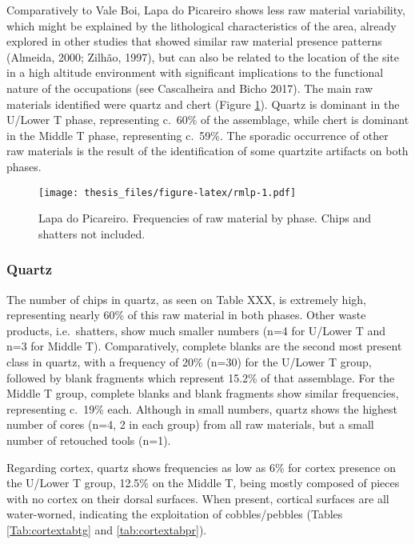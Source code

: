 \documentclass[12pt,twoside]{reedthesis}
\begin{document}
Comparatively to Vale Boi, Lapa do Picareiro shows less raw material variability, which might be explained by the lithological characteristics of the area, already explored in other studies that showed similar raw material presence patterns (Almeida, 2000; Zilhão, 1997), but can also be related to the location of the site in a high altitude environment with significant implications to the functional nature of the occupations (see Cascalheira and Bicho 2017). The main raw materials identified were quartz and chert (Figure \ref{fig:rmlp}). Quartz is dominant in the U/Lower T phase, representing c.~60\% of the assemblage, while chert is dominant in the Middle T phase, representing c.~59\%. The sporadic occurrence of other raw materials is the result of the identification of some quartzite artifacts on both phases.
\begin{figure}
\centering
\texttt{[image: thesis\_files/figure-latex/rmlp-1.pdf]}
\caption{\label{fig:rmlp}Lapa do Picareiro. Frequencies of raw material by phase. Chips and shatters not included.}
\end{figure}
\hypertarget{quartz-1}{%
\subsubsection{Quartz}\label{quartz-1}}

The number of chips in quartz, as seen on Table XXX, is extremely high, representing nearly 60\% of this raw material in both phases. Other waste products, i.e.~shatters, show much smaller numbers (n=4 for U/Lower T and n=3 for Middle T). Comparatively, complete blanks are the second most present class in quartz, with a frequency of 20\% (n=30) for the U/Lower T group, followed by blank fragments which represent 15.2\% of that assemblage. For the Middle T group, complete blanks and blank fragments show similar frequencies, representing c.~19\% each. Although in small numbers, quartz shows the highest number of cores (n=4, 2 in each group) from all raw materials, but a small number of retouched tools (n=1).

Regarding cortex, quartz shows frequencies as low as 6\% for cortex presence on the U/Lower T group, 12.5\% on the Middle T, being mostly composed of pieces with no cortex on their dorsal surfaces. When present, cortical surfaces are all water-worned, indicating the exploitation of cobbles/pebbles (Tables \ref{Tab:cortextabtg} and \ref{tab:cortextabpr}).
\end{document}
